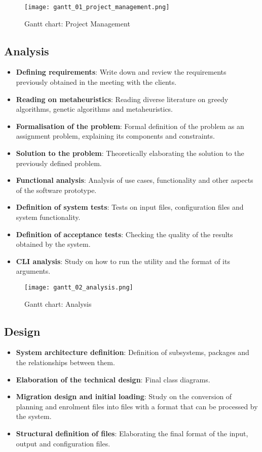 \begin{figure}[H]
    \caption{Gantt chart: Project Management}
  \centering
  \texttt{[image: gantt\_01\_project\_management.png]}
\end{figure}


\subsection{Analysis}

\begin{itemize}
    \item \textbf{Defining requirements}: Write down and review the requirements previously obtained in the meeting with the clients.
    \item \textbf{Reading on metaheuristics}: Reading diverse literature on greedy algorithms, genetic algorithms and metaheuristics. 
    \item \textbf{Formalisation of the problem}: Formal definition of the problem as an assignment problem, explaining its components and constraints.
    \item \textbf{Solution to the problem}: Theoretically elaborating the solution to the previously defined problem.
    \item \textbf{Functional analysis}: Analysis of use cases, functionality and other aspects of the software prototype.
    \item \textbf{Definition of system tests}: Tests on input files, configuration files and system functionality. 
    \item \textbf{Definition of acceptance tests}: Checking the quality of the results obtained by the system.
    \item \textbf{CLI analysis}: Study on how to run the utility and the format of its arguments. 
\end{itemize}

\begin{figure}[H]
    \caption{Gantt chart: Analysis}
  \centering
  \texttt{[image: gantt\_02\_analysis.png]}
\end{figure}


\subsection{Design}

\begin{itemize}
    \item \textbf{System architecture definition}: Definition of subsystems, packages and the relationships between them.
    \item \textbf{Elaboration of the technical design}: Final class diagrams.
    \item \textbf{Migration design and initial loading}: Study on the conversion of planning and enrolment files into files with a format that can be processed by the system.
    \item \textbf{Structural definition of files}: Elaborating the final format of the input, output and configuration files. 
\end{itemize}

